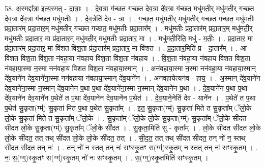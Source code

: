 \documentclass[17pt]{extarticle}
\begin{document}
58. अ॒स्मद्दा᳚त्रा॒ इत्य॒स्मत् - दा॒त्राः॒ । . दे॒व॒त्रा ग॑च्छत गच्छत देव॒त्रा दे॑व॒त्रा ग॑च्छत॒ मधु॑मती॒र् मधु॑मतीर् गच्छत देव॒त्रा दे॑व॒त्रा ग॑च्छत॒ मधु॑मतीः । . दे॒व॒त्रेति॑ देव - त्रा । . ग॒च्छ॒त॒ मधु॑मती॒र् मधु॑मतीर् गच्छत गच्छत॒ मधु॑मतीः प्रदा॒तार॑म् प्रदा॒तार॒म् मधु॑मतीर् गच्छत गच्छत॒ मधु॑मतीः प्रदा॒तार᳚म् । . मधु॑मतीः प्रदा॒तार॑म् प्रदा॒तार॒म् मधु॑मती॒र् मधु॑मतीः प्रदा॒तार॒ मा प्र॑दा॒तार॒म् मधु॑मती॒र् मधु॑मतीः प्रदा॒तार॒ मा । . मधु॑मती॒रिति॒ मधु॑ - म॒तीः॒ । . प्र॒दा॒तार॒ मा प्र॑दा॒तार॑म् प्रदा॒तार॒ मा वि॑शत विश॒ता प्र॑दा॒तार॑म् प्रदा॒तार॒ मा वि॑शत । . प्र॒दा॒तार॒मिति॑ प्र - दा॒तार᳚म् । . आ वि॑शत विश॒ता वि॑श॒ता न॑वहा॒या न॑वहाय विश॒ता वि॑श॒ता न॑वहाय । . वि॒श॒ता न॑वहा॒या न॑वहाय विशत विश॒ता न॑वहाया॒स्मा न॒स्मा नन॑वहाय विशत विश॒ता न॑वहाया॒स्मान् । . अन॑वहाया॒स्मा न॒स्मा नन॑वहा॒या न॑वहाया॒स्मान् दे॑व॒याने॑न देव॒याने॑ना॒स्मा नन॑वहा॒या न॑वहाया॒स्मान् दे॑व॒याने॑न । . अन॑वहा॒येत्यन॑व - हा॒य॒ । . अ॒स्मान् दे॑व॒याने॑न देव॒याने॑ना॒स्मा न॒स्मान् दे॑व॒याने॑न प॒था प॒था दे॑व॒याने॑ना॒स्मा न॒स्मान् दे॑व॒याने॑न प॒था । . दे॒व॒याने॑न प॒था प॒था दे॑व॒याने॑न देव॒याने॑न प॒थेते॑ त प॒था दे॑व॒याने॑न देव॒याने॑न प॒थेत॑ । . दे॒व॒याने॒नेति॑ देव - याने॑न । . प॒थेते॑ त प॒था प॒थेत॑ सु॒कृता(ग्म्॑) सु॒कृता॑ मित प॒था प॒थेत॑ सु॒कृता᳚म् । . इ॒त॒ सु॒कृता(ग्म्॑) सु॒कृता॑ मिते त सु॒कृता᳚म् ॅलो॒के लो॒के सु॒कृता॑ मिते त सु॒कृता᳚म् ॅलो॒के । . सु॒कृता᳚म् ॅलो॒के लो॒के सु॒कृता(ग्म्॑) सु॒कृता᳚म् ॅलो॒के सी॑दत सीदत लो॒के सु॒कृता(ग्म्॑) सु॒कृता᳚म् ॅलो॒के सी॑दत । . सु॒कृता॒मिति॑ सु - कृता᳚म् । . लो॒के सी॑दत सीदत लो॒के लो॒के सी॑दत॒ तत् तथ् सी॑दत लो॒के लो॒के सी॑दत॒ तत् । . सी॒द॒त॒ तत् तथ् सी॑दत सीदत॒ तन् नो॑ न॒ स्तथ् सी॑दत सीदत॒ तन् नः॑ । . तन् नो॑ न॒ स्तत् तन् नः॑ सꣳस्कृ॒तꣳ स(ग्ग्॑)स्कृ॒तम् न॒ स्तत् तन् नः॑ सꣳस्कृ॒तम् । . नः॒ स॒(ग्ग्॒)स्कृ॒तꣳ स(ग्ग्॑)स्कृ॒तम् नो॑ नः सꣳस्कृ॒तम् । . स॒(ग्ग्॒)स्कृ॒तमिति॑ सꣳस्कृ॒तम् । \newline
\pagebreak
{}
\end{document}
